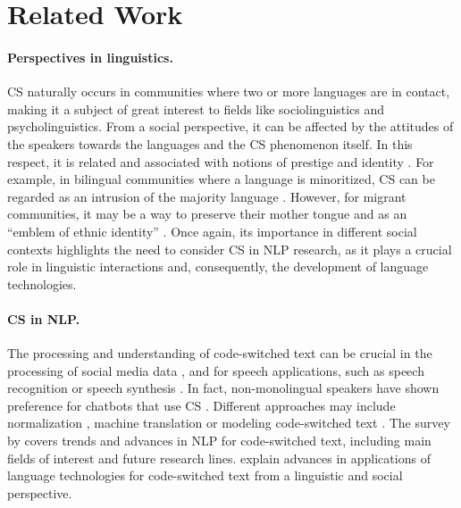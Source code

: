 \section{Related Work}
\label{sec:related-work}
\paragraph{Perspectives in linguistics.}CS naturally occurs in communities where two or more languages are in contact, making it a subject of great interest to fields like sociolinguistics and psycholinguistics. From a social perspective, it can be affected by the attitudes of the speakers towards the languages and the CS phenomenon itself. In this respect, it is related and associated with notions of prestige and identity \citep{2025-heredia-actitudes}. For example, in bilingual communities where a language is minoritized, CS can be regarded as an intrusion of the majority language \citep{dewaele-attitudes}. However, for migrant communities, it may be a way to preserve their mother tongue and as an ``emblem of ethnic identity'' \citep{poplack-sometimes}. Once again, its importance in different social contexts highlights the need to consider CS in NLP research, as it plays a crucial role in linguistic interactions and, consequently, the development of language technologies.
\paragraph{CS in NLP.} The processing and understanding of code-switched text can be crucial in the processing of social media data \citep{bali-etal-2014-borrowing-social-media}, and for speech applications, such as speech recognition or speech synthesis \citep{krishna-2017-synthesis}. In fact, non-monolingual speakers have shown preference for chatbots that use CS \citep{10.1145/3392846}. Different approaches may include normalization \citep{parikh-solorio-2021-normalization}, machine translation \citep{xu-yvon-2021-traducir} or modeling code-switched text \citep{gonen-goldberg-2019-language-modeling}. The survey by \citet{winata-etal-2023-decades} covers trends and advances in NLP for code-switched text, including main fields of interest and future research lines. \citet{dogruoz-etal-2021-survey} explain advances in applications of language technologies for code-switched text from a linguistic and social perspective. 


